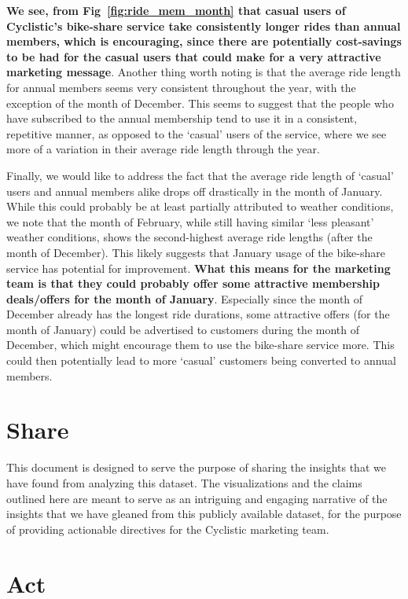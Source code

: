 \documentclass{article}
\begin{document}
\textbf{We see, from Fig~\ref{fig:ride_mem_month} that casual users of Cyclistic's bike-share service take consistently longer rides than annual members, which is encouraging, since there are potentially cost-savings to be had for the casual users that could make for a very attractive marketing message}. Another thing worth noting is that the average ride length for annual members seems very consistent throughout the year, with the exception of the month of December. This seems to suggest that the people who have subscribed to the annual membership tend to use it in a consistent, repetitive manner, as opposed to the `casual' users of the service, where we see more of a variation in their average ride length through the year.

Finally, we would like to address the fact that the average ride length of `casual' users and annual members alike drops off drastically in the month of January. While this could probably be at least partially attributed to weather conditions, we note that the month of February, while still having similar `less pleasant' weather conditions, shows the second-highest average ride lengths (after the month of December). This likely suggests that January usage of the bike-share service has potential for improvement. \textbf{What this means for the marketing team is that they could probably offer some attractive membership deals/offers for the month of January}. Especially since the month of December already has the longest ride durations, some attractive offers (for the month of January) could be advertised to customers during the month of December, which might encourage them to use the bike-share service more. This could then potentially lead to more `casual' customers being converted to annual members.


\section{Share}

This document is designed to serve the purpose of sharing the insights that we have found from analyzing this dataset. The visualizations and the claims outlined here are meant to serve as an intriguing and engaging narrative of the insights that we have gleaned from this publicly available dataset, for the purpose of providing actionable directives for the Cyclistic marketing team.

\section{Act}
\end{document}
